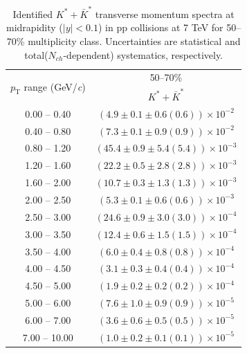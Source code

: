 \begin{table}
\caption{Identified $K^{*} + \bar{K}^{*}$ transverse momentum spectra at midrapidity ($|y|<0.1$) in pp collisions at 7 TeV for 50--70\% multiplicity class. Uncertainties are statistical and total($N_{ch}$-dependent) systematics, respectively.}
\label{tab:KStar_50to70}
\begin{center}
\begin{tabular}{ c | c }
\hline
\multirow{2}{*}{$p_{\mathrm{T}}$ range (GeV/\textit{c})} & \multicolumn{1}{c}{50--70\%} \\ & $K^{*} + \bar{K}^{*}$\\ 
\hline
0.00 -- 0.40 & $(4.9\pm0.1\pm0.6(0.6))\times10^{-2}$ \\ 
0.40 -- 0.80 & $(7.3\pm0.1\pm0.9(0.9))\times10^{-2}$ \\ 
0.80 -- 1.20 & $(45.4\pm0.9\pm5.4(5.4))\times10^{-3}$ \\ 
1.20 -- 1.60 & $(22.2\pm0.5\pm2.8(2.8))\times10^{-3}$ \\ 
1.60 -- 2.00 & $(10.7\pm0.3\pm1.3(1.3))\times10^{-3}$ \\ 
2.00 -- 2.50 & $(5.3\pm0.1\pm0.6(0.6))\times10^{-3}$ \\ 
2.50 -- 3.00 & $(24.6\pm0.9\pm3.0(3.0))\times10^{-4}$ \\ 
3.00 -- 3.50 & $(12.4\pm0.6\pm1.5(1.5))\times10^{-4}$ \\ 
3.50 -- 4.00 & $(6.0\pm0.4\pm0.8(0.8))\times10^{-4}$ \\ 
4.00 -- 4.50 & $(3.1\pm0.3\pm0.4(0.4))\times10^{-4}$ \\ 
4.50 -- 5.00 & $(1.9\pm0.2\pm0.2(0.2))\times10^{-4}$ \\ 
5.00 -- 6.00 & $(7.6\pm1.0\pm0.9(0.9))\times10^{-5}$ \\ 
6.00 -- 7.00 & $(3.6\pm0.6\pm0.5(0.5))\times10^{-5}$ \\ 
7.00 -- 10.00 & $(1.0\pm0.2\pm0.1(0.1))\times10^{-5}$ \\ 
\hline
\end{tabular}
\end{center}
\end{table}
 
